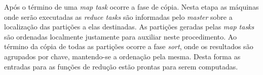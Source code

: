 Após o término de uma \textit{map task} ocorre a fase de cópia. Nesta etapa as máquinas onde serão executadas as \textit{reduce tasks} são informadas pelo \textit{master} sobre a localização das partições a elas destinadas. As partições geradas pelas \textit{map tasks} são ordenadas localmente justamente para auxiliar neste procedimento. Ao término da cópia de todas as partições ocorre a fase \textit{sort}, onde os resultados são agrupados por chave, mantendo-se a ordenação pela mesma. Desta forma as entradas para as funções de redução estão prontas para serem computadas.




